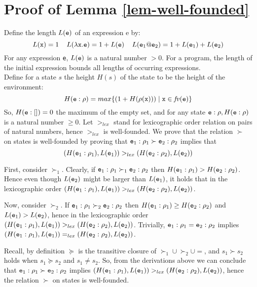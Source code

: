 \documentclass{LMCS}
\newcommand{\fl}{\noindent}
\newcommand{\hair}{\hspace{2mm}}
\newcommand{\bprf}{\proof}
\theoremstyle{definition}\newtheorem{env}[thm]{Environment}
\begin{document}
\section{Proof of Lemma \ref{lem-well-founded}}

\bprf
Define the length $L({\tt e})$ of an expression e by:
$$L({\tt x}) = 1\hair\hair L(\lambda {\tt x}.{\tt e}) = 1 + L({\tt e})\hair\hair 
L({\tt e}_1@{\tt e}_2) = 1 + L({\tt e}_1) + L({\tt e}_2)$$
For any expression {\tt e}, $L({\tt e})$ is a natural number $>0$.  For a program, the length of the initial expression bounds all lengths of occurring expressions.\\

\fl
Define for a state $s$ the height $H(s)$ of the state to be the height of the environment:
$$H({\tt e}:\rho) = max\{(1+H(\rho({\tt x})))\mid {\tt x}\in {\it fv}({\tt e})\}$$
So, $H({\tt e}:[])=0$ the maximum of the empty set, and for any state ${\tt e}:\rho, H({\tt e}:\rho)$ is a natural number $\geq 0$.
Let $>_{lex}$ stand for lexicographic order relation on pairs of natural numbers,
hence $>_{lex}$ is well-founded.
We prove that the relation $\succ$ on states is well-founded
by proving that
${\tt e}_1:\rho_1 \succ {\tt e}_2:\rho_2$
implies
that
$$(H({\tt e}_1:\rho_1),L({\tt e}_1)) >_{lex} (H({\tt e}_2:\rho_2),L({\tt e}_2))$$

First, consider $\succ_1$. Clearly, if ${\tt e}_1:\rho_1 \succ_1 {\tt e}_2:\rho_2$  then
$H({\tt e}_1:\rho_1) > H({\tt e}_2:\rho_2)$. 
Hence even though $L({\tt e}_2)$ might be  larger than $L({\tt e}_1)$, 
it holds that in the lexicographic order  
$(H({\tt e}_1:\rho_1),L({\tt e}_1)) >_{lex} (H({\tt e}_2:\rho_2),L({\tt e}_2))$.

Now, consider $\succ_2$. If ${\tt e}_1:\rho_1 \succ_2 {\tt e}_2:\rho_2$ then
$H({\tt e}_1:\rho_1) \geq H({\tt e}_2:\rho_2)$
and $L({\tt e}_1) > L({\tt e}_2)$, hence
in the lexicographic order
$(H({\tt e}_1:\rho_1),L({\tt e}_1)) >_{lex} (H({\tt e}_2:\rho_2),L({\tt e}_2))$.
Trivially, ${\tt e}_1:\rho_1 = {\tt e}_2:\rho_2$ implies
$(H({\tt e}_1:\rho_1),L({\tt e}_1)) =_{lex} (H({\tt e}_2:\rho_2),L({\tt e}_2))$.

Recall, by definition $\succeq$ is the transitive closure 
of $\succ_1 \cup \succ_2 \cup =$, and $s_1\succ s_2$ 
holds when $s_1\succeq s_2$ and $s_1\neq s_2$.
So, from the derivations above we can conclude that
${\tt e}_1:\rho_1 \succ {\tt e}_2:\rho_2$ implies
$(H({\tt e}_1:\rho_1),L({\tt e}_1)) >_{lex} (H({\tt e}_2:\rho_2),L({\tt e}_2))$,
hence the relation $\succ$ on states is well-founded.
\end{document}
